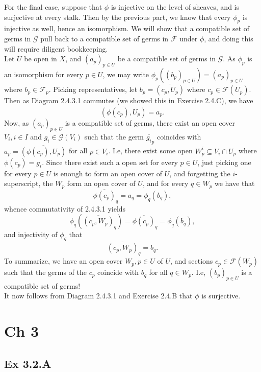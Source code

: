 \documentclass{article}
\theoremstyle{definition}
\begin{document}
For the final case, suppose that $\phi$ is injective on the level of sheaves,
and is surjective at every stalk. Then by the previous part, we know that every
$\phi_p$ is injective as well, hence an isomorphism. We will show that a
compatible set of germs in $\mathcal{G}$ pull back to a compatible set of germs
in $\mathcal{F}$ under $\phi$, and doing this will require diligent
bookkeeping. \\

Let $U$ be open in $X$, and $(a_p)_{p \in U}$ be a compatible set of germs in
$\mathcal{G}$. As $\phi_p$ is an isomorphism for every $p \in U$, we may write
$\phi_p((b_p)_{p \in U}) = (a_p)_{p \in U}$ where $b_p \in \mathcal{F}_p$.
Picking representatives, let $b_p = \overline{(c_p, U_p)}$ where $c_p \in
\mathcal{F}(U_p)$. Then as Diagram 2.4.3.1 commutes (we showed this in Exercise
2.4.C), we have
\[
	\overline{(\phi(c_p), U_p)}
	=
	a_p.
\] 
Now, as $(a_p)_{p \in U}$ is a compatible set of germs, there exist an open
cover $V_i, i \in I$ and $g_i \in \mathcal{G}(V_i)$ such that the germ
$\overline{g_i}_p$ coincides with $a_p = \overline{(\phi(c_p), U_p)}$ for all
$p \in V_i$. I.e, there exist some open $W_{p}^{i} \subseteq V_i \cap U_p$
where $\phi(c_p) = g_i$. Since there exist such a open set for every $p \in U$,
just picking one for every $p \in U$ is enough to form an open cover of $U$,
and forgetting the $i$-superscript, the $W_p$ form an open cover of $U$, and
for every $q \in W_{p}$ we have that 
\[
	\overline{\phi(c_p)}_q = a_q = \phi_q(b_q),
\]
whence commutativity of 2.4.3.1 yields 
\[
	\phi_q(\overline{(c_p, W_p)}_q)
	=
	\overline{\phi(c_p)}_q 
	= 
	\phi_q(b_q),
\]
and injectivity of $\phi_q$ that
\[
	\overline{(c_p, W_p)}_q
	= 
	b_q.
\]
To summarize, we have an open cover $W_{p}, p \in U$ of $U$, and sections $c_p
\in \mathcal{F}(W_p)$ such that the germs of the $c_p$ coincide with $b_q$ for
all $q \in W_p$. I.e, $(b_p)_{p \in U}$ is a compatible set of germs! \\

It now follows from Diagram 2.4.3.1 and Exercise 2.4.B that $\phi$ is
surjective.


\section*{Ch 3}

\subsection*{Ex 3.2.A}
\end{document}
